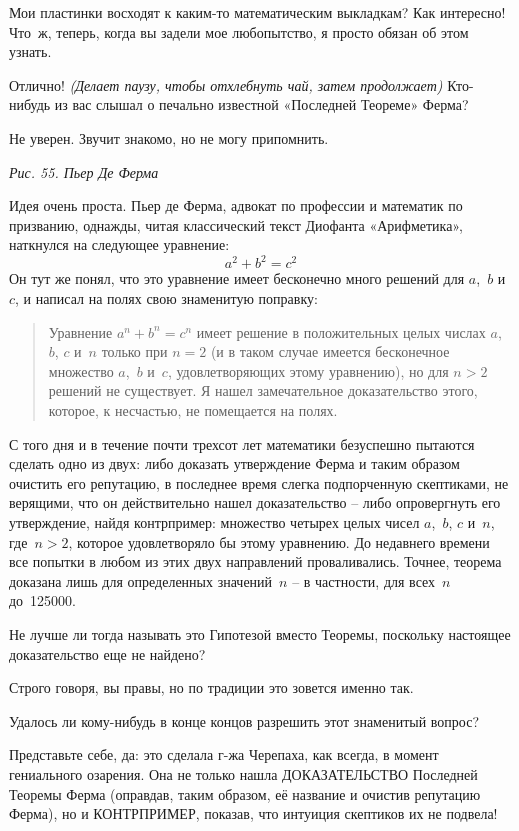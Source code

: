 \documentclass[../main.tex]{subfiles}
\begin{document}
\begin{dialogue}
 Мои пластинки восходят к каким-то математическим выкладкам? Как интересно! Что~ж, теперь, когда вы задели мое любопытство, я просто обязан об этом узнать.

 Отлично! \emph{(Делает паузу, чтобы отхлебнуть чай, затем продолжает)} Кто-нибудь из вас слышал о печально известной «Последней Теореме» Ферма?

 Не уверен. Звучит знакомо, но не могу припомнить.

\emph{Рис. 55. Пьер Де Ферма}

 Идея очень проста. Пьер де Ферма, адвокат по профессии и математик по призванию, однажды, читая классический текст Диофанта «Арифметика», наткнулся на следующее уравнение:
\[
    a^2 + b^2 = c^2
\]
Он тут же понял, что это уравнение имеет бесконечно много решений для $a$,~$b$ и~$c$, и написал на полях свою знаменитую поправку:

\begin{quote}
    Уравнение $a^n + b^n = c^n$ имеет решение в положительных целых числах $a$,~$b$, $c$ и~$n$ только при $n = 2$ (и в таком случае имеется бесконечное множество $a$,~$b$ и~$c$, удовлетворяющих этому уравнению), но для $n > 2$ решений не существует. Я нашел замечательное доказательство этого, которое, к несчастью, не помещается на полях.
\end{quote}

С того дня и в течение почти трехсот лет математики безуспешно пытаются сделать одно из двух: либо доказать утверждение Ферма и таким образом очистить его репутацию, в последнее время слегка подпорченную скептиками, не верящими, что он действительно нашел доказательство \--- либо опровергнуть его утверждение, найдя контрпример: множество четырех целых чисел $a$,~$b$, $c$ и~$n$, где~$n > 2$, которое удовлетворяло бы этому уравнению. До недавнего времени все попытки в любом из этих двух направлений проваливались. Точнее, теорема доказана лишь для определенных значений~$n$ \--- в частности, для всех~$n$ до~\num{125000}.

 Не лучше ли тогда называть это Гипотезой вместо Теоремы, поскольку настоящее доказательство еще не найдено?

 Строго говоря, вы правы, но по традиции это зовется именно так.

 Удалось ли кому-нибудь в конце концов разрешить этот знаменитый вопрос?

 Представьте себе, да: это сделала г-жа Черепаха, как всегда, в момент гениального озарения. Она не только нашла ДОКАЗАТЕЛЬСТВО Последней Теоремы Ферма (оправдав, таким образом, её название и очистив репутацию Ферма), но и КОНТРПРИМЕР, показав, что интуиция скептиков их не подвела!


\end{dialogue}
\end{document}
